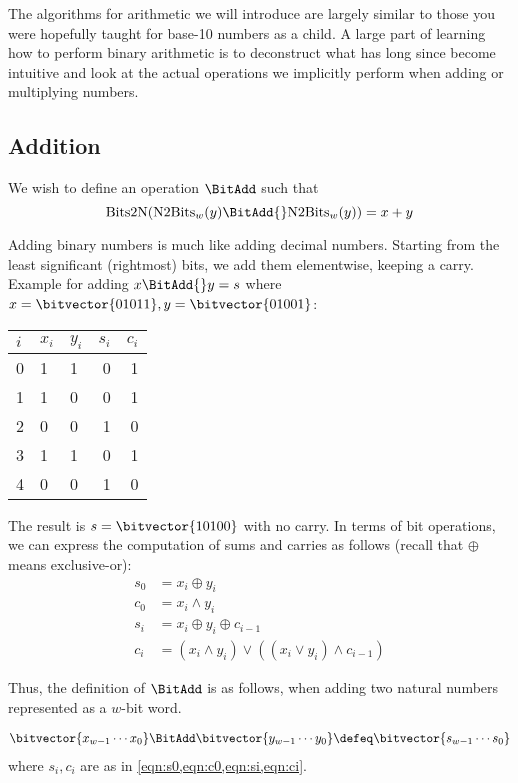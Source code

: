 The algorithms for arithmetic we will introduce are largely similar to
those you were hopefully taught for base-10 numbers as a child.  A
large part of learning how to perform binary arithmetic is to
deconstruct what has long since become intuitive and look at the
actual operations we implicitly perform when adding or multiplying
numbers.

\subsection{Addition}
\label{sec:bit-addition}

We wish to define an operation $\BitAdd$ such that
\begin{equation}
  \mathrm{Bits2N}(\mathrm{N2Bits}_{w}(y)\BitAdd{}\mathrm{N2Bits}_{w}(y)) = x + y
\end{equation}

Adding binary numbers is much like adding decimal numbers.  Starting
from the least significant (rightmost) bits, we add them elementwise,
keeping a carry.  Example for adding $x\BitAdd{} y=s$ where
$x=\bitvector{01011}, y=\bitvector{01001}$:

\begin{center}
\begin{tabular}{l|llrr}
  $i$ & $x_{i}$ & $y_{i}$ & $s_{i}$ & $c_{i}$ \\\hline
  0 & 1 & 1 & 0 & 1 \\
  1 & 1 & 0 & 0 & 1 \\
  2 & 0 & 0 & 1 & 0 \\
  3 & 1 & 1 & 0 & 1 \\
  4 & 0 & 0 & 1 & 0
\end{tabular}
\end{center}

The result is $s=\bitvector{10100}$ with no carry.  In terms of bit
operations, we can express the computation of sums and carries as
follows (recall that $\oplus$ means exclusive-or):
\begin{align}
  s_{0} &= x_{i} \oplus y_{i} \label{eqn:s0} \\
  c_{0} &= x_{i} \land y_{i} \label{eqn:c0} \\
  s_{i} &= x_{i} \oplus y_{i} \oplus c_{i-1} \label{eqn:si} \\
  c_{i} &= (x_{i} \land y_{i})\lor ((x_{i}\lor y_{i})\land c_{i-1}) \label{eqn:ci}
\end{align}

Thus, the definition of $\BitAdd$ is as follows, when adding two
natural numbers represented as a $w$-bit word.
\begin{definition}
\begin{align*}
  \bitvector{x_{w-1}\cdots{}x_{0}} \BitAdd \bitvector{y_{w-1}\cdots{}y_{0}} \defeq
  \bitvector{s_{w-1}\cdots{}s_{0}}
\end{align*}
where $s_{i},c_{i}$ are as in \cref{eqn:s0,eqn:c0,eqn:si,eqn:ci}.
\label{def:intadd}
\end{definition}

